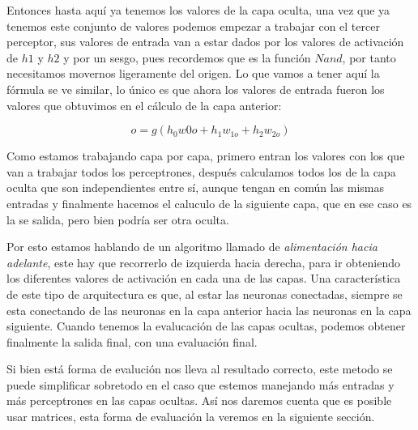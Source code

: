 Entonces hasta aquí ya tenemos los valores de la capa oculta, una vez que ya tenemos este conjunto de valores podemos empezar a trabajar con el tercer perceptor, sus valores de entrada van a estar dados por los valores de activación de $h1$ y $h2$ y por un  sesgo, pues recordemos que es la función $Nand$, por tanto necesitamos movernos ligeramente del origen. Lo que vamos a tener aquí la fórmula se ve similar, lo único  es que ahora los valores de entrada fueron los valores que obtuvimos en el cálculo de la capa anterior:

\begin{equation}
  o = g( h_{0}w{0o} + h_{1}w_{1o} + h_{2}w_{2o})
\end{equation}

Como estamos trabajando capa por capa, primero entran los valores con los que van a trabajar todos los perceptrones, después calculamos todos los de la capa oculta que son independientes entre sí, aunque tengan en común las mismas entradas y finalmente hacemos el caluculo de la siguiente capa, que en ese caso es la se salida, pero bien podría ser otra oculta. 

Por esto estamos hablando de un algoritmo llamado de \emph{alimentación hacia adelante}, este hay que recorrerlo de izquierda hacia derecha, para ir obteniendo los diferentes valores de activación en cada una de las capas. Una característica de este tipo de arquitectura es que, al estar las neuronas conectadas, siempre se esta conectando de las neuronas en la capa anterior hacia las neuronas en la capa siguiente. Cuando tenemos la evalucación de las capas ocultas, podemos obtener finalmente la salida final, con una evaluación final.

Si bien está forma de evalución nos lleva al resultado correcto, este metodo se puede simplificar sobretodo en el caso que estemos manejando más entradas y más perceptrones en las capas ocultas. Así nos daremos cuenta que es posible usar matrices, esta forma de evaluación la veremos en la siguiente sección.

